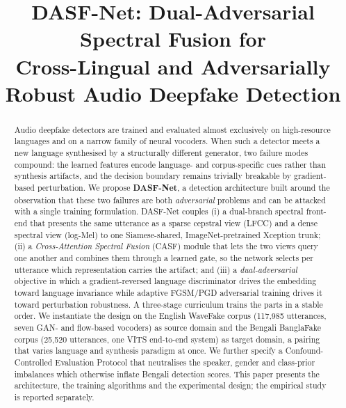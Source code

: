 \documentclass[conference]{IEEEtran}
\begin{document}
\title{DASF-Net: Dual-Adversarial Spectral Fusion for\\
Cross-Lingual and Adversarially Robust Audio Deepfake Detection}

\author{
}

\maketitle

\begin{abstract}
Audio deepfake detectors are trained and evaluated almost exclusively on
high-resource languages and on a narrow family of neural vocoders. When such
a detector meets a new language synthesised by a structurally different
generator, two failure modes compound: the learned features encode
language- and corpus-specific cues rather than synthesis artifacts, and the
decision boundary remains trivially breakable by gradient-based
perturbation. We propose \textbf{DASF-Net}, a detection architecture built
around the observation that these two failures are both \emph{adversarial}
problems and can be attacked with a single training formulation. DASF-Net
couples (i) a dual-branch spectral front-end that presents the same
utterance as a sparse cepstral view (LFCC) and a dense spectral view
(log-Mel) to one Siamese-shared, ImageNet-pretrained Xception trunk; (ii) a
\emph{Cross-Attention Spectral Fusion} (CASF) module that lets the two views
query one another and combines them through a learned gate, so the network
selects per utterance which representation carries the artifact; and (iii) a
\emph{dual-adversarial} objective in which a gradient-reversed language
discriminator drives the embedding toward language invariance while
adaptive FGSM/PGD adversarial training drives it toward perturbation
robustness. A three-stage curriculum trains the parts in a stable order. We
instantiate the design on the English WaveFake corpus (117,985 utterances,
seven GAN- and flow-based vocoders) as source domain and the Bengali
BanglaFake corpus (25,520 utterances, one VITS end-to-end system) as target
domain, a pairing that varies language and synthesis paradigm at once. We
further specify a Confound-Controlled Evaluation Protocol that neutralises
the speaker, gender and class-prior imbalances which otherwise inflate
Bengali detection scores. This paper presents the architecture, the training
algorithms and the experimental design; the empirical study is reported
separately.
\end{abstract}
\end{document}

